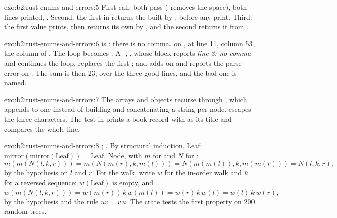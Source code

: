 \begin{solution}{exo:b2:rust-enums-and-errors:5}
First call: both  pass ( removes the space), both lines printed, . Second: the
first  in  returns the  built by , before any print. Third: the first
value prints, then  returns its own  by , and the second 
returns it from .
\end{solution}

\begin{solution}{exo:b2:rust-enums-and-errors:6}
 is : there is no comma.  on  , at line
11, column 53, the column of . The loop becomes . A
-, , whose 
block reports \emph{line 3: no comma} and continues the loop, replaces the first ; and  adds  on  and reports the parse error on
. The sum is then 23, over the three good lines, and the bad one is named.
\end{solution}

\begin{solution}{exo:b2:rust-enums-and-errors:7}
The arrays and objects recurse through , which appends to one  instead of building and
concatenating a string per node.  escapes the three characters. The test in  prints a
book record with  as its title and compares the whole line.
\end{solution}

\begin{solution}{exo:b2:rust-enums-and-errors:8}
; . By structural induction. Leaf: $\mathrm{mirror}(\mathrm{mirror}(\mathrm{Leaf})) = \mathrm{Leaf}$. Node, with $m$
for  and $N$ for :
\[ m(m(N(l, k, r))) = m(N(m(r), k, m(l))) = N(m(m(l)), k, m(m(r))) = N(l, k, r), \]
by the hypothesis on $l$ and $r$. For the walk, write $w$ for the in-order walk and $\overline{u}$ for a reversed
sequence: $w(\mathrm{Leaf})$ is empty, and
\[ w(m(N(l, k, r))) = w(m(r))\,k\,w(m(l)) = \overline{w(r)}\,k\,\overline{w(l)} = \overline{w(l)\,k\,w(r)}, \]
by the hypothesis and the rule $\overline{uv} = \overline{v}\,\overline{u}$. The crate
tests the first property on 200 random trees.
\end{solution}

